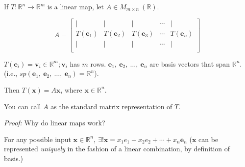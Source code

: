 \documentclass[12pt]{article}
\theoremstyle{plain}
\theoremstyle{remark}
\theoremstyle{definition}
\begin{document}
If \(T:\mathbb{R}^{n} \rightarrow \mathbb{R}^{m}\) is a linear map, let
\(A \in M_{m \times n}\ \left( \mathbb{R} \right)\).

\[A = \begin{bmatrix}
 \mid & \mid & \mid & \cdots & \mid \\
T({\mathbf{e}}_{1}) & T({\mathbf{e}}_{2}) & T({\mathbf{e}}_{3}) & \cdots & T({\mathbf{e}}_{n}) \\
 \mid & \mid & \mid & \cdots & \mid \\
\end{bmatrix}\]

\(T\left( {\mathbf{e}}_{i} \right) = {\mathbf{v}}_{i} \in \mathbb{R}^{m};{\mathbf{v}}_{i}\)
has \(m\) rows.
\({\mathbf{e}}_{1},\ {\mathbf{e}}_{2},\ \ldots,\ {\mathbf{e}}_{n}\)
are basis vectors that span \(\mathbb{R}^{n}\). (i.e.,
\(sp\left( {\mathbf{e}}_{1},\ {\mathbf{e}}_{2},\ \ldots,\ {\mathbf{e}}_{n} \right) = \mathbb{R}^{n}\)).

Then \(T\left( \mathbf{x} \right) = A\mathbf{x}\), where
\(\mathbf{x} \in \mathbb{R}^{n}\).

You can call \(A\) as the standard matrix representation of \(T\).

\emph{Proof:} Why do linear maps work?

For any possible input
\(\mathbf{x} \in \mathbb{R}^{n},\ \exists!\mathbf{x} = x_{1}e_{1} + x_{2}e_{2} + \cdots + x_{n}{\mathbf{e}}_{n}\)
(\(\mathbf{x}\) can be represented \emph{uniquely} in the fashion of
a linear combination, by definition of basis.)
\end{document}
